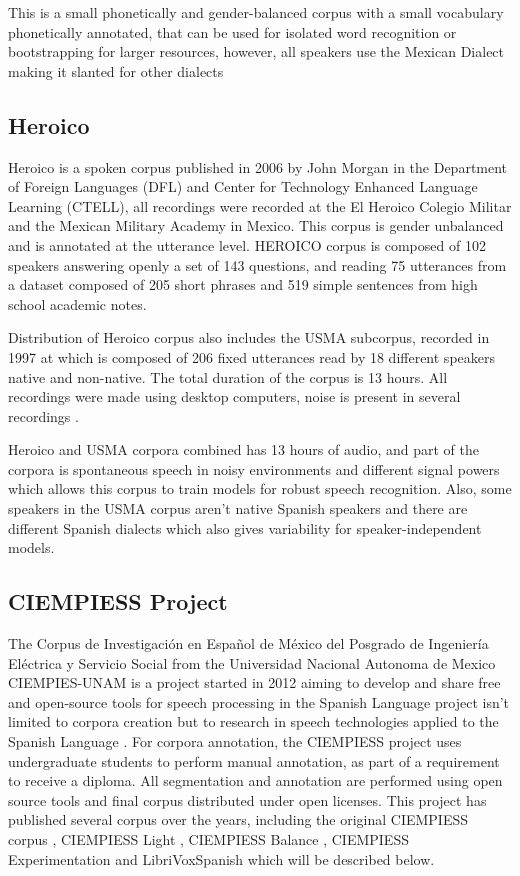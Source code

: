 \documentclass[10pt, a4paper]{article}
\begin{document}
This is a small phonetically and gender-balanced corpus with a small vocabulary phonetically annotated, that can be used for isolated word recognition or bootstrapping for larger resources, however, all speakers use the Mexican Dialect making it slanted for other dialects

\subsection{Heroico}

Heroico is a spoken corpus published in 2006 by John Morgan in the Department of Foreign Languages (DFL) and Center for Technology Enhanced Language Learning (CTELL), all recordings were recorded at the El Heroico Colegio Militar and the Mexican Military Academy in Mexico. This corpus is gender unbalanced and is annotated at the utterance level. HEROICO corpus is composed of 102 speakers answering openly a set of 143 questions, and reading 75 utterances from a dataset composed of 205 short phrases and 519 simple sentences from high school academic notes.

Distribution of Heroico corpus also includes the USMA subcorpus, recorded in 1997 at which is composed of 206 fixed utterances read by 18 different speakers native and non-native. The total duration of the corpus is 13 hours. All recordings were made using desktop computers, noise is present in several recordings \cite{heroico}.

Heroico and USMA corpora combined has 13 hours of audio, and part of the corpora is spontaneous speech in noisy environments and different signal powers which allows this corpus to train models for robust speech recognition. Also, some speakers in the USMA corpus aren't native Spanish speakers and there are different Spanish dialects which also gives variability for speaker-independent models.
 

\subsection{CIEMPIESS Project}

The Corpus de Investigación en Español de México del Posgrado de Ingeniería Eléctrica y Servicio Social from the Universidad Nacional Autonoma de Mexico CIEMPIES-UNAM is a project started in 2012 aiming to develop and share free and open-source tools for speech processing in the Spanish Language project isn't limited to corpora creation but to research in speech technologies applied to the Spanish Language \cite{CIEMPIESS-Webpage}. For corpora annotation, the CIEMPIESS project uses undergraduate students to perform manual annotation, as part of a requirement to receive a diploma. All segmentation and annotation are performed using open source tools and final corpus distributed under open licenses. This project has published several corpus over the years, including the original CIEMPIESS corpus \cite{CIEMPIESS}, CIEMPIESS Light \cite{CIEMPIESS-LIGHT}, CIEMPIESS Balance \cite{CIEMPIESS-BALANCE}, CIEMPIESS Experimentation \cite{CIEMPIESS-Experimentation} and LibriVoxSpanish \cite{LibriVox-Spanish} which will be described below.
\end{document}

